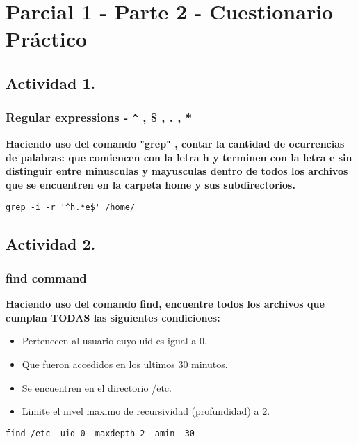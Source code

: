 \documentclass[a4paper,11pt,spanish]{article} %
\begin{document}
\pagebreak

\section{Parcial 1 - Parte 2 - Cuestionario Práctico}

\subsection{Actividad 1.}

\subsubsection{Regular expressions - \texttt{\^} , \$ , . , *}

\textbf{Haciendo uso del comando "grep" , contar la cantidad de ocurrencias de palabras:
 que comiencen con la letra h y terminen con la letra e
 sin distinguir entre minusculas y mayusculas
 dentro de todos los archivos que se encuentren en la carpeta home y sus subdirectorios.}

\begin{verbatim}
grep -i -r '^h.*e$' /home/ 
\end{verbatim}

\subsection{Actividad 2.}

\subsubsection{find command}

\textbf{Haciendo uso del comando find, encuentre todos los archivos que cumplan TODAS las siguientes condiciones:}\\

\begin{itemize}
 \item Pertenecen al usuario cuyo uid es igual a 0.
 \item Que fueron accedidos en los ultimos 30 minutos.
 \item Se encuentren en el directorio /etc.
 \item Limite el nivel maximo de recursividad (profundidad) a 2.
\end{itemize}

\begin{verbatim}
find /etc -uid 0 -maxdepth 2 -amin -30
\end{verbatim}
\end{document}
